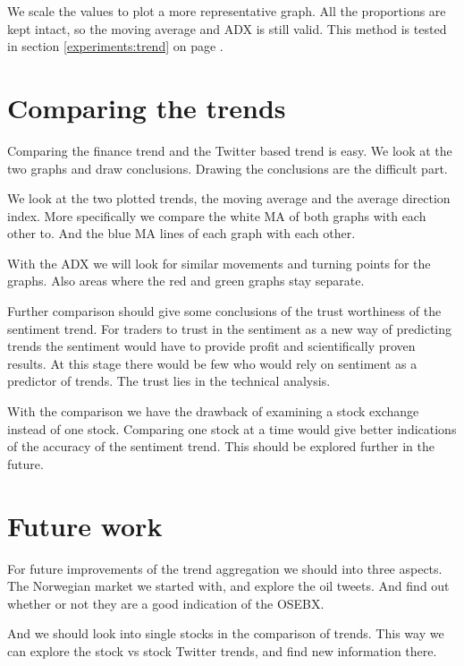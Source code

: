 We scale the values to plot a more representative graph. All the
proportions are kept intact, so the moving average and ADX is still valid.
This method is tested in section \ref{experiments:trend} on page
\pageref{experiments:trend}.
% 

\section{Comparing the trends}\label{trend:compared}
Comparing the finance trend and the Twitter based trend is easy. We look at the
two graphs and draw conclusions. Drawing the conclusions are the difficult
part.

We look at the two plotted trends, the moving average and the average direction
index. More specifically we compare the white MA of both graphs with each other
to. And the blue MA lines of each graph with each other. 

With the ADX we will look for similar movements and turning points for the
graphs. Also areas where the red and green graphs stay separate. 

Further comparison should give some conclusions of the trust worthiness of the
sentiment trend. For traders to trust in the sentiment as a new way of
predicting trends the sentiment would have to provide profit and scientifically
proven results. At this stage there would be few who would rely on sentiment as
a predictor of trends.
The trust lies in the technical analysis.  

With the comparison we have the drawback of examining a stock exchange instead
of one stock. Comparing one stock at a time would give better indications of
the accuracy of the sentiment trend. This should be explored further in the
future.   
%

\section{Future work}
For future improvements of the trend aggregation we should into three aspects.
The Norwegian market we started with, and explore the oil tweets. And find out
whether or not they are a good indication of the OSEBX. 

And we should look into single stocks in the comparison of trends. This way we
can explore the stock vs stock Twitter trends, and find new information there.  
%
